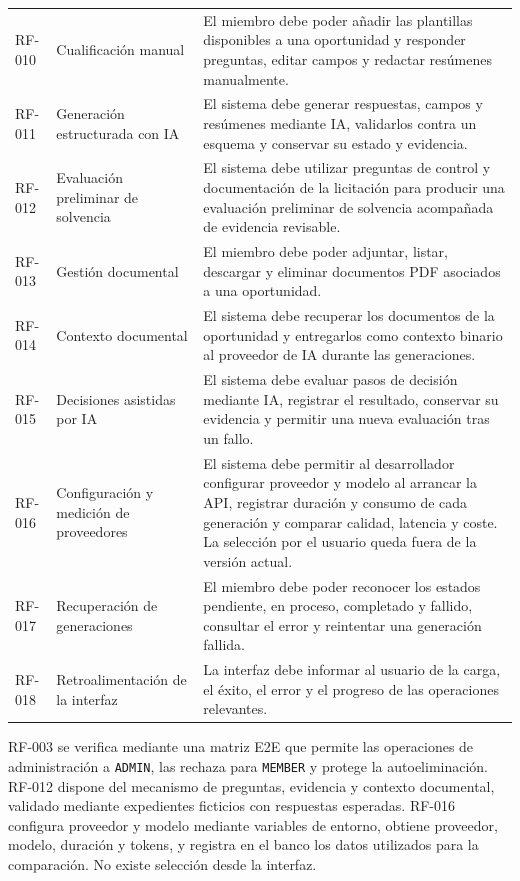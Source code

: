 {\begin{longtable}{@{}L{1.7cm}L{3cm}L{9cm}@{}}
  RF-010 & Cualificación manual & El miembro debe poder añadir las plantillas disponibles a una oportunidad y responder preguntas, editar campos y redactar resúmenes manualmente. \\
  RF-011 & Generación estructurada con IA & El sistema debe generar respuestas, campos y resúmenes mediante IA, validarlos contra un esquema y conservar su estado y evidencia. \\
  RF-012 & Evaluación preliminar de solvencia & El sistema debe utilizar preguntas de control y documentación de la licitación para producir una evaluación preliminar de solvencia acompañada de evidencia revisable. \\
  RF-013 & Gestión documental & El miembro debe poder adjuntar, listar, descargar y eliminar documentos PDF asociados a una oportunidad. \\
  RF-014 & Contexto documental & El sistema debe recuperar los documentos de la oportunidad y entregarlos como contexto binario al proveedor de IA durante las generaciones. \\
  RF-015 & Decisiones asistidas por IA & El sistema debe evaluar pasos de decisión mediante IA, registrar el resultado, conservar su evidencia y permitir una nueva evaluación tras un fallo. \\
  RF-016 & Configuración y medición de proveedores & El sistema debe permitir al desarrollador configurar proveedor y modelo al arrancar la API, registrar duración y consumo de cada generación y comparar calidad, latencia y coste. La selección por el usuario queda fuera de la versión actual. \\
  RF-017 & Recuperación de generaciones & El miembro debe poder reconocer los estados pendiente, en proceso, completado y fallido, consultar el error y reintentar una generación fallida. \\
  RF-018 & Retroalimentación de la interfaz & La interfaz debe informar al usuario de la carga, el éxito, el error y el progreso de las operaciones relevantes. \\
\end{longtable}
}

\vspace{0.6\baselineskip}

RF-003 se verifica mediante una matriz E2E que permite las operaciones de
administración a \texttt{ADMIN}, las rechaza para \texttt{MEMBER} y protege la
autoeliminación. RF-012 dispone del mecanismo de preguntas, evidencia y
contexto documental, validado mediante expedientes ficticios con respuestas
esperadas. RF-016 configura proveedor y modelo mediante variables de entorno,
obtiene proveedor, modelo, duración y tokens, y registra en el banco los datos
utilizados para la comparación. No existe selección desde la interfaz.

